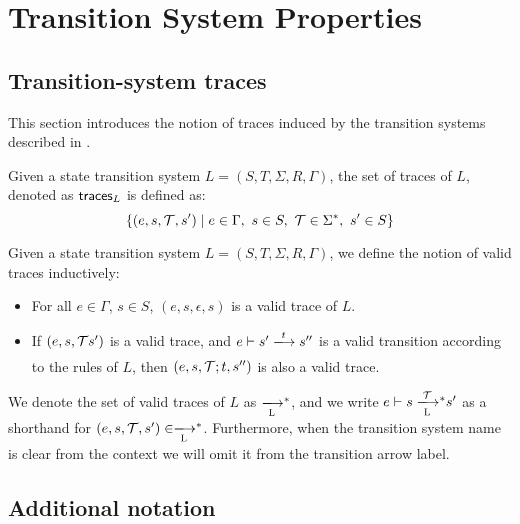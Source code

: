 \section{Transition System Properties}
\label{sec:ts-properties}


\subsection{Transition-system traces}
\label{sec:ts-traces}

This section introduces the notion of traces induced by the transition systems
described in \cite{small_step_semantics}.

\begin{definition}[Traces]
  Given a state transition system $L=(S,T,\Sigma, R, \Gamma)$, the set of
  traces of $L$, denoted as $\mathsf{traces}_L$ is defined as:
  $$
  \{ (e, s, \mathcal{T}, s') \mid e \in \Gamma,~ s \in S,~ \mathcal{T} \in \Sigma^{*},~ s' \in S\}
  $$

\end{definition}


\begin{definition}
  Given a state transition system $L=(S,T,\Sigma, R, \Gamma)$, we define the
  notion of valid traces inductively:

  \begin{itemize}
  \item For all $e \in \Gamma$, $s \in S$, $(e, s, \epsilon, s)$ is a valid
    trace of $L$.

  \item If $(e, s, \mathcal{T} s')$ is a valid trace, and
    $e \vdash s' \trans{}{\var{t}} s''$ is a valid transition according to the
    rules of $L$, then $(e, s, \mathcal{T}; t, s'')$ is also a valid trace.
  \end{itemize}

\end{definition}

We denote the set of valid traces of $L$ as $\transtar{L}{}$, and we write
$e \vdash s \transtar{L}{\txs} s'$ as a shorthand for
$(e, s, \txs, s') \in \transtar{L}{}$. Furthermore, when the transition system
name is clear from the context we will omit it from the transition arrow label.

\subsection{Additional notation}
\label{sec:additional-notation}

